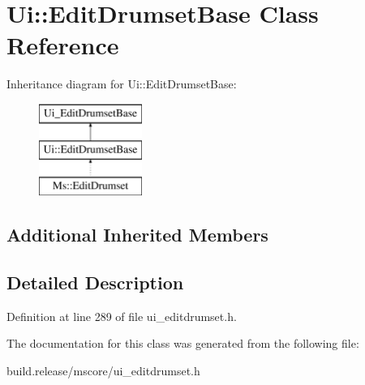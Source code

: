 \hypertarget{class_ui_1_1_edit_drumset_base}{}\section{Ui\+:\+:Edit\+Drumset\+Base Class Reference}
\label{class_ui_1_1_edit_drumset_base}
Inheritance diagram for Ui\+:\+:Edit\+Drumset\+Base\+:\begin{figure}[H]
\begin{center}
\leavevmode
\includegraphics[height=3.000000cm]{class_ui_1_1_edit_drumset_base}
\end{center}
\end{figure}
\subsection*{Additional Inherited Members}


\subsection{Detailed Description}


Definition at line 289 of file ui\+\_\+editdrumset.\+h.



The documentation for this class was generated from the following file\+:\begin{DoxyCompactItemize}
\item 
build.\+release/mscore/ui\+\_\+editdrumset.\+h\end{DoxyCompactItemize}

